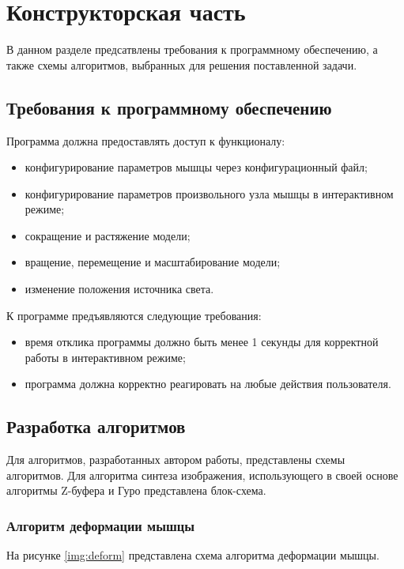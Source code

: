 \chapter{Конструкторская часть}

В данном разделе предсатвлены требования к программному обеспечению, а также схемы алгоритмов, выбранных для решения поставленной задачи.

\section{Требования к программному обеспечению}

Программа должна предоставлять доступ к функционалу:
\begin{itemize}
    \item конфигурирование параметров мышцы через конфигурационный файл;
    \item конфигурирование параметров произвольного узла мышцы в интерактивном режиме;
    \item сокращение и растяжение модели;
    \item вращение, перемещение и масштабирование модели;
    \item изменение положения источника света.
\end{itemize}

К программе предъявляются следующие требования:
\begin{itemize}
    \item время отклика программы должно быть менее 1 секунды для корректной работы в интерактивном режиме;
    \item программа должна корректно реагировать на любые действия пользователя.
\end{itemize}

\clearpage
\section{Разработка алгоритмов}

Для алгоритмов, разработанных автором работы, представлены схемы алгоритмов. Для алгоритма синтеза изображения, использующего в своей основе алгоритмы Z-буфера\cite{zbuf} и Гуро\cite{lmodels} представлена блок-схема.

\subsection{Алгоритм деформации мышцы}

На рисунке \ref{img:deform} представлена схема алгоритма деформации мышцы.


